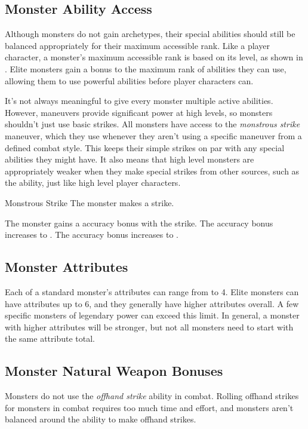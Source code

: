         \subsection{Monster Ability Access}\label{Monster Ability Access}
            Although monsters do not gain archetypes, their special abilities should still be balanced appropriately for their maximum accessible rank.
            Like a player character, a monster's maximum accessible rank is based on its level, as shown in .
            Elite monsters gain a  bonus to the maximum rank of abilities they can use, allowing them to use powerful abilities before player characters can.

            It's not always meaningful to give every monster multiple active abilities.
            However, maneuvers provide significant power at high levels, so monsters shouldn't just use basic strikes.
            All monsters have access to the \textit{monstrous strike} maneuver, which they use whenever they aren't using a specific maneuver from a defined combat style.
            This keeps their simple strikes on par with any special abilities they might have.
            It also means that high level monsters are appropriately weaker when they make special strikes from other sources, such as the  ability, just like high level player characters.
            \begin{activeability}{Monstrous Strike}
                The monster makes a strike.

                \rankline
                 The monster gains a  accuracy bonus with the strike.
                 The accuracy bonus increases to .
                 The accuracy bonus increases to .
            \end{activeability}

    \subsection{Monster Attributes}\label{Monster Attributes}
        Each of a standard monster's attributes can range from  to 4.
        Elite monsters can have attributes up to 6, and they generally have higher attributes overall.
        A few specific monsters of legendary power can exceed this limit.
        In general, a monster with higher attributes will be stronger, but not all monsters need to start with the same attribute total.

    \subsection{Monster Natural Weapon Bonuses}\label{Monster Natural Weapon Bonuses}
        Monsters do not use the \textit{offhand strike} ability in combat.
        Rolling offhand strikes for monsters in combat requires too much time and effort, and monsters aren't balanced around the ability to make offhand strikes.

